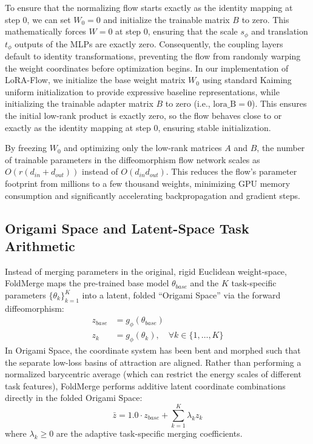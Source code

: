 To ensure that the normalizing flow starts exactly as the identity mapping at step 0, we can set $W_{0} = 0$ and initialize the trainable matrix $B$ to zero. This mathematically forces $W = 0$ at step 0, ensuring that the scale $s_\phi$ and translation $t_\phi$ outputs of the MLPs are exactly zero. Consequently, the coupling layers default to identity transformations, preventing the flow from randomly warping the weight coordinates before optimization begins. In our implementation of LoRA-Flow, we initialize the base weight matrix $W_0$ using standard Kaiming uniform initialization to provide expressive baseline representations, while initializing the trainable adapter matrix $B$ to zero (i.e., $\text{lora\_B} = 0$). This ensures the initial low-rank product is exactly zero, so the flow behaves close to or exactly as the identity mapping at step 0, ensuring stable initialization.

By freezing $W_{0}$ and optimizing only the low-rank matrices $A$ and $B$, the number of trainable parameters in the diffeomorphism flow network scales as $O(r(d_{in} + d_{out}))$ instead of $O(d_{in} d_{out})$. This reduces the flow's parameter footprint from millions to a few thousand weights, minimizing GPU memory consumption and significantly accelerating backpropagation and gradient steps.

\subsection{Origami Space and Latent-Space Task Arithmetic}
Instead of merging parameters in the original, rigid Euclidean weight-space, FoldMerge maps the pre-trained base model $\theta_{base}$ and the $K$ task-specific parameters $\{ \theta_k \}_{k=1}^K$ into a latent, folded ``Origami Space'' via the forward diffeomorphism:
\begin{align}
  z_{base} &= g_\phi(\theta_{base}) \\
  z_k &= g_\phi(\theta_k), \quad \forall k \in \{1, \dots, K\}
\end{align}
In Origami Space, the coordinate system has been bent and morphed such that the separate low-loss basins of attraction are aligned. 
Rather than performing a normalized barycentric average (which can restrict the energy scales of different task features), FoldMerge performs additive latent coordinate combinations directly in the folded Origami Space:
\begin{equation}
  \bar{z} = 1.0 \cdot z_{base} + \sum_{k=1}^K \lambda_k z_k
\end{equation}
where $\lambda_k \geq 0$ are the adaptive task-specific merging coefficients. 

